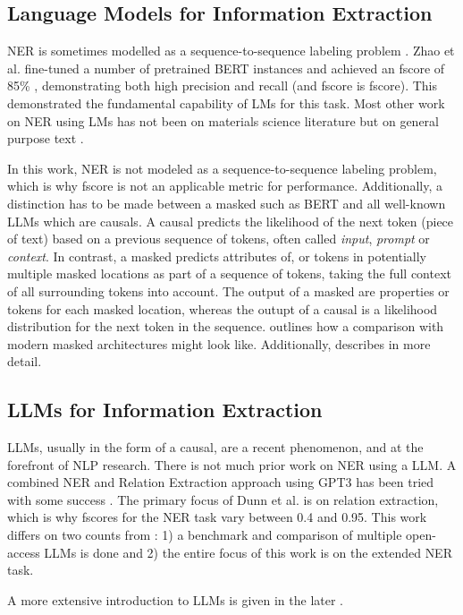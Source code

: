 \subsection{Language Models for Information Extraction}\label{sub:lmie}
\gls{NER} is sometimes modelled as a sequence-to-sequence labeling problem \cite{zhao_finetuning_2021, dunn_structured_2022}.
Zhao et al. fine-tuned a number of pretrained \gls{BERT} instances and achieved an \gls{fscore} of 85\% \cite{zhao_finetuning_2021}, demonstrating both high precision and recall (and \gls{fscore} is \glsdesc{fscore}).
This demonstrated the fundamental capability of \glspl{LM} for this task.
Most other work on \gls{NER} using \glspl{LM} has not been on materials science literature but on general purpose text \cite{li_survey_2022}.


In this work, \gls{NER} is not modeled as a sequence-to-sequence labeling problem, which is why \gls{fscore} is not an applicable metric for performance.
Additionally, a distinction has to be made between a \gls{masked} such as \gls{BERT} and all well-known \glspl{LLM} which are \glspl{causal}.
A \gls{causal} predicts the likelihood of the next token (piece of text) based on a previous sequence of tokens, often called \textit{input}, \textit{prompt} or \textit{context}.
In contrast, a \gls{masked} predicts attributes of, or tokens in potentially multiple masked locations as part of a sequence of tokens, taking the full context of all surrounding tokens into account.
The output of a \gls{masked} are properties or tokens for each masked location, whereas the outupt of a \gls{causal} is a likelihood distribution for the next token in the sequence.
 outlines how a comparison with modern \gls{masked} architectures might look like. Additionally,  describes  in more detail.

\subsection{LLMs for Information Extraction}\label{sub:llmie}
\glspl{LLM}, usually in the form of a \gls{causal}, are a recent phenomenon, and at the forefront of \gls{NLP} research.
There is not much prior work on \gls{NER} using a \gls{LLM}.
A combined \gls{NER} and Relation Extraction approach using \gls{GPT3} has been tried with some success \cite{dunn_structured_2022}.
The primary focus of Dunn et al. \cite{dunn_structured_2022} is on relation extraction, which is why \glspl{fscore} for the \gls{NER} task vary between 0.4 and 0.95.
This work differs on two counts from \cite{dunn_structured_2022}: 1) a benchmark and comparison of multiple open-access \glspl{LLM} is done and 2) the entire focus of this work is on the extended \gls{NER} task.

A more extensive introduction to \glspl{LLM} is given in the later .

